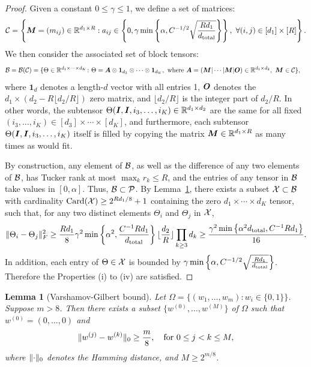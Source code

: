 \documentclass{article}
\theoremstyle{plain}
\newtheorem{lem}{Lemma}
\theoremstyle{definition}
\begin{document}
\begin{proof}
Given a constant $0\leq \gamma \leq 1$, we define a set of matrices:
\[
\mathcal{C}=\left\{\bm M=(m_{ij})\in\mathbb{R}^{d_1\times R}: a_{ij}\in \left\{ 0,\gamma \min\left\{ \alpha , C^{-1/2}\sqrt{Rd_1\over d_{\text{total}}} \right\}\right\} ,\  \forall (i,j)\in[d_1]\times[R]\right\}.
\]
We then consider the associated set of block tensors:
\begin{align}
\mathcal{B}=\mathcal{B}(\mathcal{C})=\{\Theta\in\mathbb{R}^{d_1\times \cdots \times d_K}\colon& \Theta=\bm A\otimes \mathbf{1}_{d_3}\otimes \cdots \otimes \mathbf{1}_{d_K}, \ \text{where}\ \bm A=(\bm M|\cdots|\bm M|\bm{O}) \in\mathbb{R}^{d_1\times d_2},\ \bm M\in\mathcal{C}\},
\end{align}
where $\mathbf{1}_d$ denotes a length-$d$ vector with all entries 1, $\bm{O}$ denotes the $d_1\times (d_2-R\lfloor d_2/R \rfloor)$ zero matrix, and $\lfloor d_2/ R \rfloor$ is the integer part of $d_2/R$. In other words, the subtensor $\Theta(\bm I, \bm I,i_3, \ldots,i_K)\in\mathbb{R}^{d_1\times d_2}$ are the same for all fixed $(i_3,\ldots,i_K)\in[d_3]\times \cdots \times [d_K]$, and furthermore, each subtensor $\Theta(\bm I,\bm I, i_3,\ldots,i_K)$ itself is filled by copying the matrix $\bm M\in\mathbb{R}^{d_1\times R}$ as many times as would fit.

By construction, any element of $\mathcal{B}$, as well as the difference of any two elements of $\mathcal{B}$, has Tucker rank at most $\max_k r_k\leq R$, and the entries of any tensor in $\mathcal{B}$ take values in $[0,\alpha]$. Thus, $\mathcal{B}\subset\mathcal{P}$. By Lemma~\ref{lem:VGbound}, there exists a subset $\mathcal{X}\subset \mathcal{B}$ with cardinality $\text{Card}(\mathcal{X})\geq 2^{Rd_1/8}+1$ containing the zero $d_1\times \cdots \times d_K$ tensor, such that, for any two distinct elements $\Theta_i$ and $\Theta_j$ in $\mathcal{X}$,
\[
\lVert\Theta_i-\Theta_j\rVert_F^2 \geq {Rd_1\over 8} \gamma^2\min\left\{ \alpha^2, {C^{-1}Rd_1 \over d_{\text{total}}}\right\} \lfloor {d_2\over R} \rfloor \prod_{k\geq 3}d_k\geq {\gamma^2\min\left\{ \alpha^2 d_{\text{total}}, C^{-1}Rd_1\right\}  \over 16}.
\]
In addition, each entry of $\Theta\in\mathcal{X}$ is bounded by $\gamma \min\left\{ \alpha , C^{-1/2}\sqrt{Rd_1\over d_{\text{total}}}\right\} $. Therefore the Properties (i) to (iv) are satisfied.
\end{proof}



\begin{lem}[Varshamov-Gilbert bound]\label{lem:VGbound}
Let $\Omega=\{(w_1,\ldots,w_m)\colon w_i\in\{0,1\}\}$. Suppose $m>8$. Then there exists a subset $\{w^{(0)},\ldots,w^{(M)}\}$ of $\Omega$ such that $w^{(0)}=(0,\ldots,0)$ and
\[
\lVert w^{(j)}-w^{(k)}\rVert_0\geq {m\over 8},\quad \text{for} \ 0\leq j<k\leq M,
\]
where $\lVert\cdot\rVert_0$ denotes the Hamming distance, and $M\geq 2^{m/8}$.
\end{lem}
\end{document}
